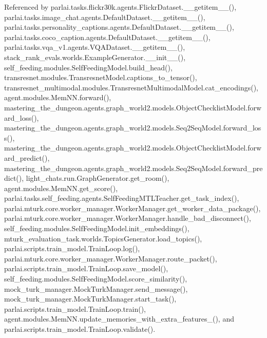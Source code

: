 Referenced by parlai.\+tasks.\+flickr30k.\+agents.\+Flickr\+Dataset.\+\_\+\+\_\+getitem\+\_\+\+\_\+(), parlai.\+tasks.\+image\+\_\+chat.\+agents.\+Default\+Dataset.\+\_\+\+\_\+getitem\+\_\+\+\_\+(), parlai.\+tasks.\+personality\+\_\+captions.\+agents.\+Default\+Dataset.\+\_\+\+\_\+getitem\+\_\+\+\_\+(), parlai.\+tasks.\+coco\+\_\+caption.\+agents.\+Default\+Dataset.\+\_\+\+\_\+getitem\+\_\+\+\_\+(), parlai.\+tasks.\+vqa\+\_\+v1.\+agents.\+V\+Q\+A\+Dataset.\+\_\+\+\_\+getitem\+\_\+\+\_\+(), stack\+\_\+rank\+\_\+evals.\+worlds.\+Example\+Generator.\+\_\+\+\_\+init\+\_\+\+\_\+(), self\+\_\+feeding.\+modules.\+Self\+Feeding\+Model.\+build\+\_\+head(), transresnet.\+modules.\+Transresnet\+Model.\+captions\+\_\+to\+\_\+tensor(), transresnet\+\_\+multimodal.\+modules.\+Transresnet\+Multimodal\+Model.\+cat\+\_\+encodings(), agent.\+modules.\+Mem\+N\+N.\+forward(), mastering\+\_\+the\+\_\+dungeon.\+agents.\+graph\+\_\+world2.\+models.\+Object\+Checklist\+Model.\+forward\+\_\+loss(), mastering\+\_\+the\+\_\+dungeon.\+agents.\+graph\+\_\+world2.\+models.\+Seq2\+Seq\+Model.\+forward\+\_\+loss(), mastering\+\_\+the\+\_\+dungeon.\+agents.\+graph\+\_\+world2.\+models.\+Object\+Checklist\+Model.\+forward\+\_\+predict(), mastering\+\_\+the\+\_\+dungeon.\+agents.\+graph\+\_\+world2.\+models.\+Seq2\+Seq\+Model.\+forward\+\_\+predict(), light\+\_\+chats.\+run.\+Graph\+Generator.\+get\+\_\+room(), agent.\+modules.\+Mem\+N\+N.\+get\+\_\+score(), parlai.\+tasks.\+self\+\_\+feeding.\+agents.\+Self\+Feeding\+M\+T\+L\+Teacher.\+get\+\_\+task\+\_\+index(), parlai.\+mturk.\+core.\+worker\+\_\+manager.\+Worker\+Manager.\+get\+\_\+worker\+\_\+data\+\_\+package(), parlai.\+mturk.\+core.\+worker\+\_\+manager.\+Worker\+Manager.\+handle\+\_\+bad\+\_\+disconnect(), self\+\_\+feeding.\+modules.\+Self\+Feeding\+Model.\+init\+\_\+embeddings(), mturk\+\_\+evaluation\+\_\+task.\+worlds.\+Topics\+Generator.\+load\+\_\+topics(), parlai.\+scripts.\+train\+\_\+model.\+Train\+Loop.\+log(), parlai.\+mturk.\+core.\+worker\+\_\+manager.\+Worker\+Manager.\+route\+\_\+packet(), parlai.\+scripts.\+train\+\_\+model.\+Train\+Loop.\+save\+\_\+model(), self\+\_\+feeding.\+modules.\+Self\+Feeding\+Model.\+score\+\_\+similarity(), mock\+\_\+turk\+\_\+manager.\+Mock\+Turk\+Manager.\+send\+\_\+message(), mock\+\_\+turk\+\_\+manager.\+Mock\+Turk\+Manager.\+start\+\_\+task(), parlai.\+scripts.\+train\+\_\+model.\+Train\+Loop.\+train(), agent.\+modules.\+Mem\+N\+N.\+update\+\_\+memories\+\_\+with\+\_\+extra\+\_\+features\+\_\+(), and parlai.\+scripts.\+train\+\_\+model.\+Train\+Loop.\+validate().

